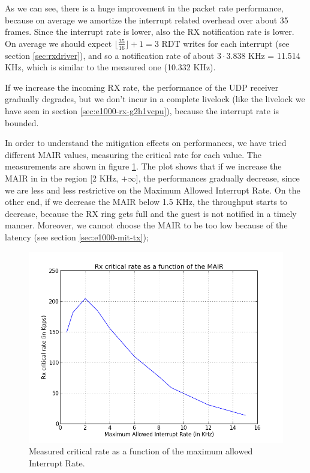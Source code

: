 As we can see, there is a huge improvement in the packet rate performance, because on average we amortize the interrupt related overhead
over about 35 frames. Since the interrupt rate is lower, also the RX notification rate is lower. On average we should expect 
$\lfloor \frac{35}{16} \rfloor + 1 = 3$ RDT writes for each interrupt (see section \ref{sec:rxdriver}), and so a notification rate of 
about $3 \cdot 3.838$ KHz = 11.514 KHz, which is similar to the measured one (10.332 KHz).

If we increase the incoming RX rate, the performance of the UDP receiver gradually degrades, but we don't incur in a complete livelock 
(like the livelock we have seen in section \ref{sec:e1000-rx-g2h1vcpu}), because the interrupt rate is bounded.

\vspace{0.5cm}

In order to understand the mitigation effects on performances, we have tried different MAIR values, measuring the critical rate for
each value. The measurements are shown in figure \ref{fig:itr-vs-cr}.
The plot shows that if we increase the MAIR in in the region [2 KHz, $+\infty$], the performances gradually decrease, since we are 
less and less restrictive on the Maximum Allowed Interrupt Rate.
On the other end, if we decrease the MAIR below 1.5 KHz, the throughput starts to decrease, because the RX ring gets full and the guest
is not notified in a timely manner.
Moreover, we cannot choose the MAIR to be too low because of the latency (see section \ref{sec:e1000-mit-tx});

\begin{figure}[bt]
\centering
\includegraphics[scale = 0.7]{MAIR-vs-CR.png}
\caption{Measured critical rate as a function of the maximum allowed Interrupt Rate.}
\label{fig:itr-vs-cr}
\end{figure}


